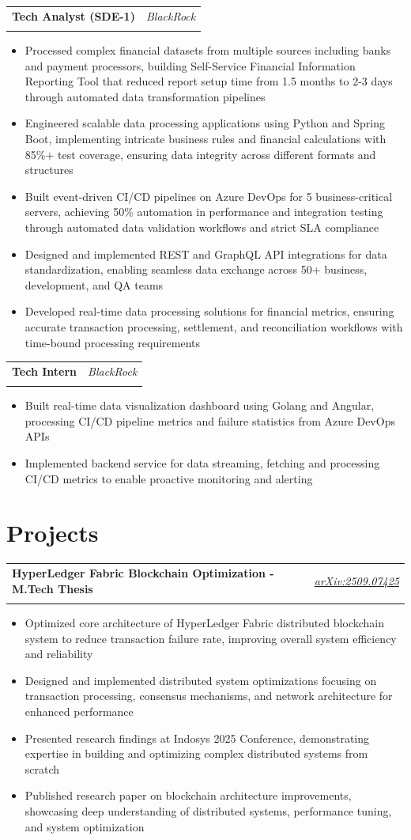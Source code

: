 \documentclass[11pt,a4paper]{article}
\makeatletter
\newcommand{\resumeItem}[1]{\item\small{#1}}
\newlength{\resumeLeftCol}
\newlength{\resumeRightCol}
\newcommand{\resumeHeading}[4]{
  \begin{tabular*}{\textwidth}{@{}p{\resumeLeftCol}@{\extracolsep{\fill}}>{\raggedleft\arraybackslash}p{\resumeRightCol}@{}}
    \textbf{#1} & \textit{#2} \\
    & \textit{\ifstrempty{#4}{#3}{#3 \ #4}}
  \end{tabular*}
  \vspace{-4pt}
}
\makeatother
\begin{document}
\resumeHeading{Tech Analyst (SDE-1)}{BlackRock}{July 2021 - June 2023}{}
\begin{itemize}[leftmargin=*,noitemsep,topsep=0pt]
    \resumeItem{Processed complex financial datasets from multiple sources including banks and payment processors, building Self-Service Financial Information Reporting Tool that reduced report setup time from 1.5 months to 2-3 days through automated data transformation pipelines}
    \resumeItem{Engineered scalable data processing applications using Python and Spring Boot, implementing intricate business rules and financial calculations with 85\%+ test coverage, ensuring data integrity across different formats and structures}
    \resumeItem{Built event-driven CI/CD pipelines on Azure DevOps for 5 business-critical servers, achieving 50\% automation in performance and integration testing through automated data validation workflows and strict SLA compliance}
    \resumeItem{Designed and implemented REST and GraphQL API integrations for data standardization, enabling seamless data exchange across 50+ business, development, and QA teams}
    \resumeItem{Developed real-time data processing solutions for financial metrics, ensuring accurate transaction processing, settlement, and reconciliation workflows with time-bound processing requirements}
\end{itemize}

\resumeHeading{Tech Intern}{BlackRock}{January 2021 - July 2021}{}
\begin{itemize}[leftmargin=*,noitemsep,topsep=0pt]
    \resumeItem{Built real-time data visualization dashboard using Golang and Angular, processing CI/CD pipeline metrics and failure statistics from Azure DevOps APIs}
    \resumeItem{Implemented backend service for data streaming, fetching and processing CI/CD metrics to enable proactive monitoring and alerting}
\end{itemize}

\section{Projects}
\resumeHeading{HyperLedger Fabric Blockchain Optimization - M.Tech Thesis}{\href{https://arxiv.org/abs/2509.07425}{arXiv:2509.07425}}{IIT Hyderabad}{2024-2025}
\begin{itemize}[leftmargin=*,noitemsep,topsep=0pt]
    \resumeItem{Optimized core architecture of HyperLedger Fabric distributed blockchain system to reduce transaction failure rate, improving overall system efficiency and reliability}
    \resumeItem{Designed and implemented distributed system optimizations focusing on transaction processing, consensus mechanisms, and network architecture for enhanced performance}
    \resumeItem{Presented research findings at Indosys 2025 Conference, demonstrating expertise in building and optimizing complex distributed systems from scratch}
    \resumeItem{Published research paper on blockchain architecture improvements, showcasing deep understanding of distributed systems, performance tuning, and system optimization}
\end{itemize}
\end{document}
